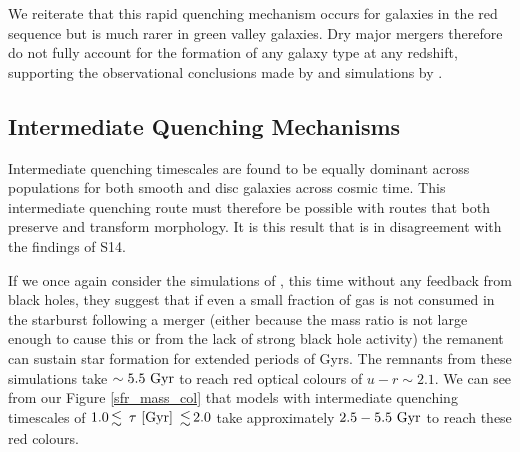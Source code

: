 \documentclass[useAMS,usenatbib]{mn2e}
\def\changed    {\color{titlecol} }
\begin{document}


{\changed We reiterate that this rapid quenching mechanism occurs for galaxies in the red sequence but is much rarer in green valley galaxies.} Dry major mergers therefore do not fully account for the formation of any galaxy type at any redshift, supporting the observational conclusions made by \citet{Bell07,Bundy07, Kav14} and simulations by \citet{Genel08}.

\subsection{Intermediate Quenching Mechanisms}\label{int}
{\changed Intermediate quenching timescales are found to be equally dominant across populations for both smooth and disc galaxies across cosmic time.} This intermediate quenching route must therefore be possible with routes that both preserve and transform morphology. It is this result that is in disagreement with the findings of S14. 

If we once again consider the simulations of \citet{Springel05}, this time without any feedback from black holes, they suggest that if even a small fraction of gas is not consumed in the starburst following a merger (either because the mass ratio is not large enough to cause this or from the lack of strong black hole activity) the remanent can sustain star formation for extended periods of Gyrs. The remnants from these simulations take $\sim5.5~\rm{Gyr}$ to reach red optical colours of $u-r \sim 2.1$. We can see from our Figure \ref{sfr_mass_col} that models with intermediate quenching timescales of $1.0 \la ~\tau~\rm{[Gyr]} ~\la 2.0$ take approximately $2.5-5.5~\rm{Gyr}$ to reach these red colours.
\end{document}
